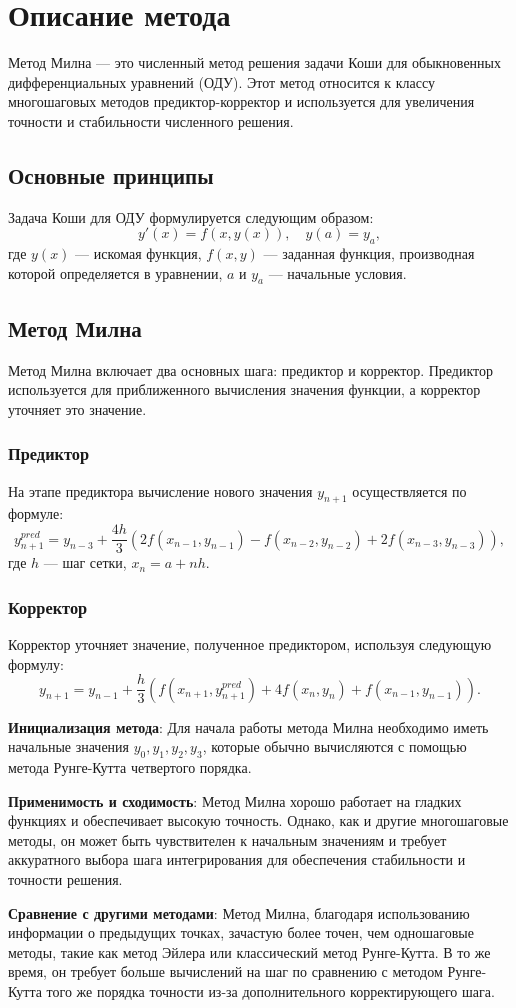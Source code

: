 \section{Описание метода}

Метод Милна — это численный метод решения задачи Коши для обыкновенных дифференциальных уравнений (ОДУ). Этот метод относится к классу многошаговых методов предиктор-корректор и используется для увеличения точности и стабильности численного решения.

\subsection{Основные принципы}

Задача Коши для ОДУ формулируется следующим образом:
\[
y'(x) = f(x, y(x)), \quad y(a) = y_a,
\]
где \(y(x)\) — искомая функция, \(f(x, y)\) — заданная функция, производная которой определяется в уравнении, \(a\) и \(y_a\) — начальные условия.

\subsection{Метод Милна}

Метод Милна включает два основных шага: предиктор и корректор. Предиктор используется для приближенного вычисления значения функции, а корректор уточняет это значение.

\subsubsection{Предиктор}
На этапе предиктора вычисление нового значения \(y_{n+1}\) осуществляется по формуле:
\[
y_{n+1}^{pred} = y_{n-3} + \frac{4h}{3} \left( 2f(x_{n-1}, y_{n-1}) - f(x_{n-2}, y_{n-2}) + 2f(x_{n-3}, y_{n-3}) \right),
\]
где \(h\) — шаг сетки, \(x_n = a + nh\).

\subsubsection{Корректор}
Корректор уточняет значение, полученное предиктором, используя следующую формулу:
\[
y_{n+1} = y_{n-1} + \frac{h}{3} \left( f(x_{n+1}, y_{n+1}^{pred}) + 4f(x_n, y_n) + f(x_{n-1}, y_{n-1}) \right).
\]

\textbf{Инициализация метода}: Для начала работы метода Милна необходимо иметь начальные значения \(y_0, y_1, y_2, y_3\), которые обычно вычисляются с помощью метода Рунге-Кутта четвертого порядка.

\textbf{Применимость и сходимость}: Метод Милна хорошо работает на гладких функциях и обеспечивает высокую точность. Однако, как и другие многошаговые методы, он может быть чувствителен к начальным значениям и требует аккуратного выбора шага интегрирования для обеспечения стабильности и точности решения.

\textbf{Сравнение с другими методами}: Метод Милна, благодаря использованию информации о предыдущих точках, зачастую более точен, чем одношаговые методы, такие как метод Эйлера или классический метод Рунге-Кутта. В то же время, он требует больше вычислений на шаг по сравнению с методом Рунге-Кутта того же порядка точности из-за дополнительного корректирующего шага.
